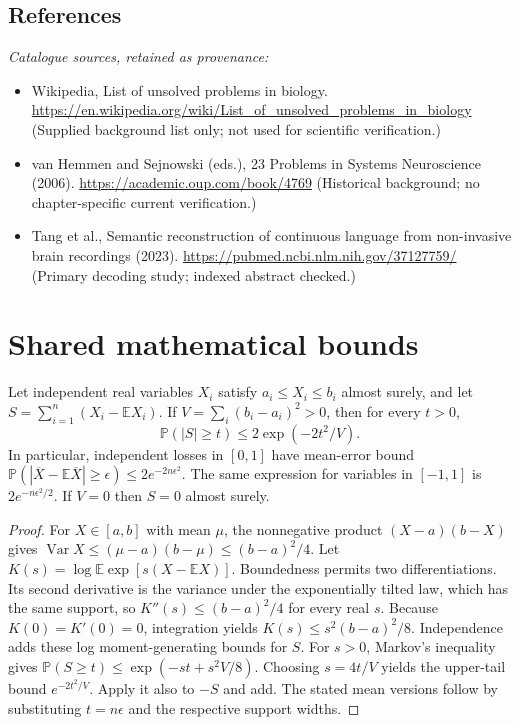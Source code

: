 \documentclass[11pt]{article}
\begin{document}
\subsection{References}
\noindent\emph{Catalogue sources, retained as provenance:}
\begin{itemize}
\item Wikipedia, List of unsolved problems in biology. \url{https://en.wikipedia.org/wiki/List_of_unsolved_problems_in_biology} (Supplied background list only; not used for scientific verification.)
\item van Hemmen and Sejnowski (eds.), 23 Problems in Systems Neuroscience (2006). \url{https://academic.oup.com/book/4769} (Historical background; no chapter-specific current verification.)
\item Tang et al., Semantic reconstruction of continuous language from non-invasive brain recordings (2023). \url{https://pubmed.ncbi.nlm.nih.gov/37127759/} (Primary decoding study; indexed abstract checked.)
\end{itemize}




\section{Shared mathematical bounds}\label{app:bounds}
\begin{lemma}\label{lem:bounded}
Let independent real variables $X_i$ satisfy $a_i\leq X_i\leq b_i$ almost surely,
and let $S=\sum_{i=1}^n(X_i-\mathbb{E} X_i)$. If
$V=\sum_i(b_i-a_i)^2>0$, then for every $t>0$,
\[
 \mathbb{P}(|S|\geq t)\leq 2\exp(-2t^2/V).
\]
In particular, independent losses in $[0,1]$ have mean-error bound
$\mathbb{P}(|\overline X-\mathbb{E}\overline X|\geq\epsilon)
\leq2e^{-2n\epsilon^2}$. The same expression for variables in $[-1,1]$
is $2e^{-n\epsilon^2/2}$. If $V=0$ then $S=0$ almost surely.
\end{lemma}
\begin{proof}
For $X\in[a,b]$ with mean $\mu$, the nonnegative product
$(X-a)(b-X)$ gives
$\operatorname{Var} X\leq(\mu-a)(b-\mu)\leq(b-a)^2/4$.
Let $K(s)=\log\mathbb{E}\exp[s(X-\mathbb{E} X)]$.
Boundedness permits two differentiations. Its second derivative is the variance
under the exponentially tilted law, which has the same support, so
$K''(s)\leq(b-a)^2/4$ for every real $s$.
Because $K(0)=K'(0)=0$, integration yields
$K(s)\leq s^2(b-a)^2/8$.
Independence adds these log moment-generating bounds for $S$.
For $s>0$, Markov's inequality gives
$\mathbb{P}(S\geq t)\leq\exp(-st+s^2V/8)$.
Choosing $s=4t/V$ yields the upper-tail bound $e^{-2t^2/V}$.
Apply it also to $-S$ and add. The stated mean versions follow by substituting
$t=n\epsilon$ and the respective support widths.
\end{proof}
\end{document}
